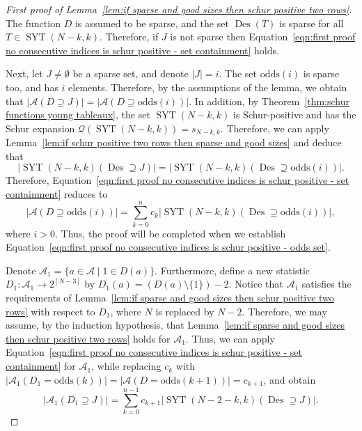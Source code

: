 \documentclass[ALCO]{cedram}
\newcommand{\Des}{\operatorname{Des}}
\newcommand{\Syt}{\operatorname{SYT}}
\newcommand{\Q}{\mathcal{Q}}
\newcommand{\A}{\mathcal{A}}
\newcommand{\odds}{\mathrm{odds}}
\begin{document}
\begin{proof}[First proof of Lemma~\ref{lem:if sparse and good sizes then schur positive two rows}]
    The function $D$ is assumed to be sparse, and the set $\Des(T)$ is sparse for all $T \in \Syt(N-k,k)$. Therefore, if $J$ is not sparse then Equation~\eqref{eqn:first proof no consecutive indices is schur positive - set containment} holds.

    Next, let $J \ne \emptyset$ be a sparse set, and denote $|J| = i$. The set $\odds(i)$ is sparse too, and has $i$ elements. Therefore, by the assumptions of the lemma, we obtain that $\left|\A(D \supseteq J)\right| = \left|\A(D \supseteq \odds(i))\right|$.
    In addition, by Theorem~\ref{thm:schur functions young tableaux}, the set $\Syt(N-k,k)$ is Schur-positive and has the Schur expansion $\Q(\Syt(N-k,k)) = s_{N-k,k}$. Therefore, we can apply Lemma~\ref{lem:if schur positive two rows then sparse and good sizes} and deduce that
    \[
        \left|\Syt(N-k,k)(\Des \supseteq J)\right| = \left|\Syt(N-k,k)(\Des \supseteq \odds(i))\right|.
    \]
    Therefore, Equation~\ref{eqn:first proof no consecutive indices is schur positive - set containment} reduces to
    \begin{equation}\label{eqn:first proof no consecutive indices is schur positive - odds set}
        \left|\A(D \supseteq \odds(i))\right| = \sum_{k=0}^n c_k \left|\Syt(N-k,k)(\Des \supseteq \odds(i))\right|,
    \end{equation}
    where $i > 0$. Thus, the proof will be completed when we establish Equation~\eqref{eqn:first proof no consecutive indices is schur positive - odds set}.
    
    Denote $\A_1 = \{a \in \A \mid 1\in D(a)\}$. Furthermore, define a new statistic $D_1:\A_1 \to 2^{[N-3]}$ by $D_1(a) = (D(a)\setminus\{1\})-2$. Notice that $\A_1$ satisfies the requirements of Lemma~\ref{lem:if sparse and good sizes then schur positive two rows} with respect to $D_1$, where $N$ is replaced by $N-2$. Therefore, we may assume, by the induction hypothesis, that Lemma~\ref{lem:if sparse and good sizes then schur positive two rows} holds for $\A_1$. Thus, we can apply Equation~\eqref{eqn:first proof no consecutive indices is schur positive - set containment} for $\A_1$, while replacing $c_k$ with $|\A_1(D_1 = \odds(k))| = |\A(D = \odds(k+1))| = c_{k+1}$, and obtain
    \begin{equation}\label{eqn:first proof no consecutive indices is schur positive - induction}
        \left|\A_1(D_1 \supseteq J)\right| = \sum_{k=0}^{n-1} c_{k+1} \left|\Syt(N-2-k,k)(\Des \supseteq J)\right|.
    \end{equation}
    

\end{proof}
\end{document}
